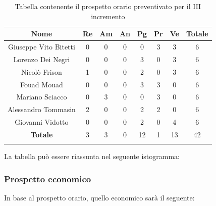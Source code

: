 			\begin{longtable}{|c|c|c|c|c|c|c|c}
				\hline
				\rowcolor{lighter-grayer}
				\textbf{Nome} & \textbf{Re} & \textbf{Am} & \textbf{An} & \textbf{Pg}  & \textbf{Pr}   & \textbf{Ve} & \textbf{Totale} \\
				\hline
				\endfirsthead
				\hline
				Giuseppe Vito Bitetti & 0 & 0 & 0 & 0 & 3 & 3 & 6\\
				\hline
				\hline
				Lorenzo Dei Negri & 0 & 0 & 0 & 3 & 0 & 3 & 6\\
				\hline
				\hline
				Nicolò Frison & 1 & 0 & 0 & 2 & 0 & 3 & 6 \\
				\hline
				\hline
				Fouad Mouad & 0 & 0 & 0 & 3 & 3 & 0 & 6\\
				\hline
				\hline
				Mariano Sciacco & 0 & 3 & 0 & 0 & 3 & 0 & 6 \\
				\hline
				\hline
				Alessandro Tommasin & 2 & 0 & 0 & 2 & 2 & 0 & 6\\
				\hline
				\hline
				Giovanni Vidotto & 0 & 0 & 0 & 2 & 0 & 4 & 6 \\
				\hline 
				\textbf{Totale} & 3 &  3 & 0 & 12 & 1 & 13 & 42\\
				\hline 
				
				\caption{Tabella contenente il prospetto orario preventivato per il III incremento}
			\end{longtable}
			\pagebreak	
			
			La tabella può essere riassunta nel seguente istogramma:
			
			
		\subsubsection{Prospetto economico}
			In base al prospetto orario, quello economico sarà il seguente: 
			
